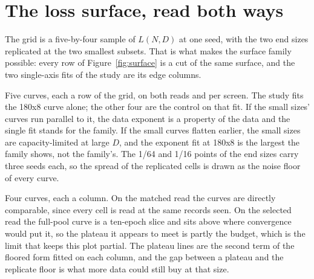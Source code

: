 
\section{The loss surface, read both ways}
\label{sec:surface}

The grid is a five-by-four sample of $L(N, D)$ at one seed, with the two end
sizes replicated at the two smallest subsets. That is what makes the surface
family possible: every row of Figure~\ref{fig:surface} is a cut of the same
surface, and the two single-axis fits of the study are its edge columns.


Five curves, each a row of the grid, on both reads and per screen. The study fits
the 180x8 curve alone; the other four are the control on that fit. If the small
sizes' curves run parallel to it, the data exponent is a property of the data
and the single fit stands for the family. If the small curves flatten earlier,
the small sizes are capacity-limited at large $D$, and the exponent fit at 180x8
is the largest the family shows, not the family's. The 1/64 and 1/16 points of
the end sizes carry three seeds each, so the spread of the replicated cells is
drawn as the noise floor of every curve.

Four curves, each a column. On the matched read the curves are directly
comparable, since every cell is read at the same records seen. On the selected
read the full-pool curve is a ten-epoch slice and sits above where convergence
would put it, so the plateau it appears to meet is partly the budget, which is
the limit that keeps this plot partial. The plateau lines are the second term of
the floored form fitted on each column, and the gap between a plateau and the
replicate floor is what more data could still buy at that size.

